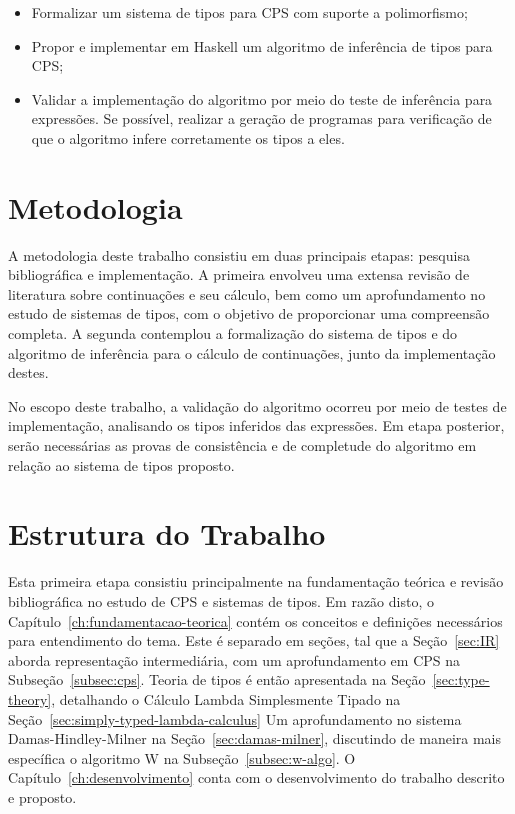 \begin{itemize}
  \item Formalizar um sistema de tipos para CPS com suporte a polimorfismo;\@
  \item Propor e implementar em Haskell um algoritmo de inferência de tipos para CPS;\@
  \item Validar a implementação do algoritmo por meio do teste de inferência para expressões. Se possível, realizar a geração de programas para verificação de que o algoritmo infere corretamente os tipos a eles.
\end{itemize}

\section{Metodologia}\label{sec:metodologia}

A metodologia deste trabalho consistiu em duas principais etapas: pesquisa bibliográfica e implementação.
A primeira envolveu uma extensa revisão de literatura sobre continuações e seu cálculo, bem como um aprofundamento no estudo de sistemas de tipos, com o objetivo de proporcionar uma compreensão completa.
A segunda contemplou a formalização do sistema de tipos e do algoritmo de inferência para o cálculo de continuações, junto da implementação destes.

No escopo deste trabalho, a validação do algoritmo ocorreu por meio de testes de implementação, analisando os tipos inferidos das expressões.
Em etapa posterior, serão necessárias as provas de consistência e de completude do algoritmo em relação ao sistema de tipos proposto.

\section{Estrutura do Trabalho}\label{sec:estrutura-trabalho}

Esta primeira etapa consistiu principalmente na fundamentação teórica e revisão bibliográfica no estudo de CPS e sistemas de tipos.
Em razão disto, o Capítulo~\ref{ch:fundamentacao-teorica} contém os conceitos e definições necessários para entendimento do tema.
Este é separado em seções, tal que a Seção~\ref{sec:IR} aborda representação intermediária, com um aprofundamento em CPS na Subseção~\ref{subsec:cps}.
Teoria de tipos é então apresentada na Seção~\ref{sec:type-theory}, detalhando o Cálculo Lambda Simplesmente Tipado na Seção~\ref{sec:simply-typed-lambda-calculus}
Um aprofundamento no sistema Damas-Hindley-Milner na Seção~\ref{sec:damas-milner}, discutindo de maneira mais específica o algoritmo W na Subseção~\ref{subsec:w-algo}.
O Capítulo~\ref{ch:desenvolvimento} conta com o desenvolvimento do trabalho descrito e proposto.

